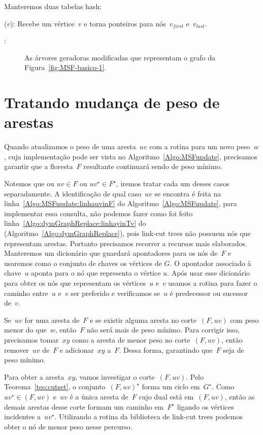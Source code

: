 Manteremos duas tabelas hash:

\hashNP($v$): Recebe um vértice~$v$ e torna ponteiros para nós~$v_{first}$ e~$v_{last}$.

\hashEdges:

\begin{figure}[htb]
\scalebox{1.5}{
\centering

}
\caption{As árvores geradoras modificadas que representam o grafo da Figura~\ref{fig:MSF-basico-1}.}
\label{fig:MSF-figura-4}
\end{figure}


\section{Tratando mudança de peso de arestas}

Quando atualizamos o peso de uma aresta~$uv$ com a rotina \MSFupdate{} para um novo peso~$w$, cuja implementação pode ser vista no Algoritmo~\ref{Algo:MSFupdate}, precisamos garantir que a floresta~$F$ resultante continuará sendo  de peso mínimo.

Notemos que ou $uv\in F$ ou $uv^\star\in F^\star$, iremos tratar cada um desses casos separadamente.
A identificação de qual caso~$uv$ se encontra é feita na linha~\ref{Algo:MSFupdate:linhauvinF} do Algoritmo~\ref{Algo:MSFupdate}, para implementar essa consulta, não podemos fazer como foi feito linha~\ref{Algo:dymGraphReplace:linhayinTv} do \dymGraphReplace(Algoritmo~\ref{Algo:dymGraphReplace}), pois link-cut trees não possuem nós que representam arestas.
Portanto precisamos recorrer a recursos mais elaborados.
Manteremos um dicionário que guardará apontadores para os nós de~$F$ e usaremos como o conjunto de chaves os vértices de $G$. O apontador associado à chave~$u$ aponta para o nó que representa o vértice $u$.
Após usar esse dicionário para obter os nós que representam os vértices~$u$ e~$v$ usamos a rotina \linkcutPath{} para fazer o caminho entre~$u$ e~$v$ ser preferido e verificamos se~$u$ é predecessor ou sucessor de~$v$.

Se~$uv$ for uma aresta de~$F$ e se existir alguma aresta no corte~$(F, uv)$ com peso menor do que~$w$, então~$F$ não será mais de peso mínimo.
Para corrigir isso, precisamos tomar~$xy$ como a aresta de menor peso no corte~$(F, uv)$,
então remover~$uv$ de~$F$ e adicionar~$xy$ a~$F$.
Dessa forma, garantindo que~$F$ seja de peso mínimo.

Para obter a aresta~$xy$, vamos investigar o corte~$(F, uv)$.
Pelo Teorema~\ref{teo:cutset}, o conjunto~$(F, uv)^\star$ forma um ciclo em~$G^\star$.
Como~$uv^\star\in(F, uv)$ e~$uv$ é a única aresta de~$F$ cujo dual está em~$(F, uv)$, então as demais arestas desse corte formam um caminho em~$F^\star$ ligando os vértices incidentes a~$uv^\star$.
Utilizando a rotina \linkcutMin{}  da biblioteca de link-cut trees podemos obter o nó de menor peso nesse percurso.

